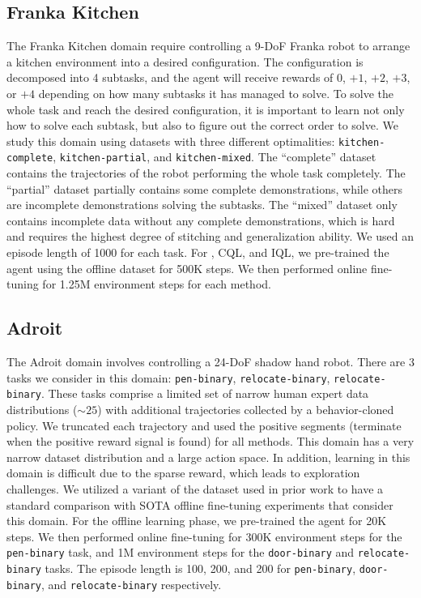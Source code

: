 \subsection{Franka Kitchen} 
The Franka Kitchen domain require controlling a 9-DoF Franka robot to arrange a kitchen environment into a desired configuration. The configuration is decomposed into 4 subtasks, and the agent will receive rewards of $0$, $+1$, $+2$, $+3$, or $+4$ depending on how many subtasks it has managed to solve. To solve the whole task and reach the desired configuration, it is important to learn not only how to solve each subtask, but also to figure out the correct order to solve. We study this domain using datasets with three different optimalities: \texttt{kitchen-complete}, \texttt{kitchen-partial}, and \texttt{kitchen-mixed}. The ``complete'' dataset contains the trajectories of the robot performing the whole task completely. The ``partial'' dataset partially contains some complete demonstrations, while others are incomplete demonstrations solving the subtasks. The ``mixed'' dataset only contains incomplete data without any complete demonstrations, which is hard and requires the highest degree of stitching and generalization ability. We used an episode length of 1000 for each task. For \methodname, CQL, and IQL, we pre-trained the agent using the offline dataset for 500K steps. We then performed online fine-tuning for 1.25M environment steps for each method.

\subsection{Adroit} 
The Adroit domain involves controlling a 24-DoF shadow hand robot. There are 3 tasks we consider in this domain: \texttt{pen-binary}, \texttt{relocate-binary}, \texttt{relocate-binary}. These tasks comprise a limited set of narrow human expert data distributions ($\sim 25$) with additional trajectories collected by a behavior-cloned policy. We truncated each trajectory and used the positive segments (terminate when the positive reward signal is found) for all methods. This domain has a very narrow dataset distribution and a large action space. In addition, learning in this domain is difficult due to the sparse reward, which leads to exploration challenges. We utilized a variant of the dataset used in prior work \cite{AWAC} to have a standard comparison with SOTA offline fine-tuning experiments that consider this domain. For the offline learning phase, we pre-trained the agent for 20K steps. We then performed online fine-tuning for 300K environment steps for the \texttt{pen-binary} task, and 1M environment steps for the \texttt{door-binary} and \texttt{relocate-binary} tasks. The episode length is 100, 200, and 200 for \texttt{pen-binary}, \texttt{door-binary}, and \texttt{relocate-binary} respectively.

